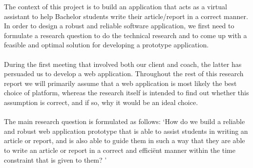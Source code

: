 The context of this project is to build an application that acts as a virtual assistant to help Bachelor students write their article/report in a correct manner. In order to design a robust and reliable software application, we first need to formulate a research question to do the technical research and to come up with a feasible and optimal solution for developing a prototype application.\\\\

During the first meeting that involved both our client and coach, the latter has persuaded us to develop a web application. Throughout the rest of this research report we will primarily assume that a web application is most likely the best choice of platform, whereas the research itself is intended to find out whether this assumption is correct, and if so, why it would be an ideal choice. \\\\

The main research question is formulated as follows: `How do we build a reliable and robust web application prototype that is able to assist students in writing an article or report, and is also able to guide them in such a way that they are able to write an article or report in a correct and effici\"ent manner within the time constraint that is given to them? '

